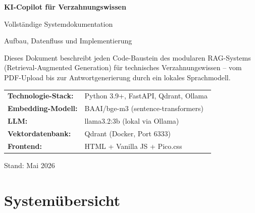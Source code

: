\documentclass[12pt, a4paper]{article}
\begin{document}
\begin{titlepage}
  \centering
  \vspace*{2cm}
  {\Huge\bfseries\color{accentblue} KI-Copilot für Verzahnungswissen\par}
  \vspace{0.5cm}
  {\Large\color{accentgray} Vollständige Systemdokumentation\par}
  \vspace{0.3cm}
  {\large Aufbau, Datenfluss und Implementierung\par}
  \vspace{2cm}

  \begin{tcolorbox}[colback=boxbg, colframe=boxframe, width=0.85\textwidth]
    \centering\small
    Dieses Dokument beschreibt jeden Code-Baustein des modularen RAG-Systems
    (Retrieval-Augmented Generation) für technisches Verzahnungswissen --
    vom PDF-Upload bis zur Antwortgenerierung durch ein lokales Sprachmodell.
  \end{tcolorbox}

  \vspace{2cm}
  \begin{tabular}{ll}
    \textbf{Technologie-Stack:} & Python 3.9+, FastAPI, Qdrant, Ollama \\
    \textbf{Embedding-Modell:}  & BAAI/bge-m3 (sentence-transformers) \\
    \textbf{LLM:}               & llama3.2:3b (lokal via Ollama) \\
    \textbf{Vektordatenbank:}   & Qdrant (Docker, Port 6333) \\
    \textbf{Frontend:}          & HTML + Vanilla JS + Pico.css \\
  \end{tabular}

  \vfill
  {\small Stand: Mai 2026}
\end{titlepage}

\tableofcontents
\newpage

\section{Systemübersicht}
\end{document}
